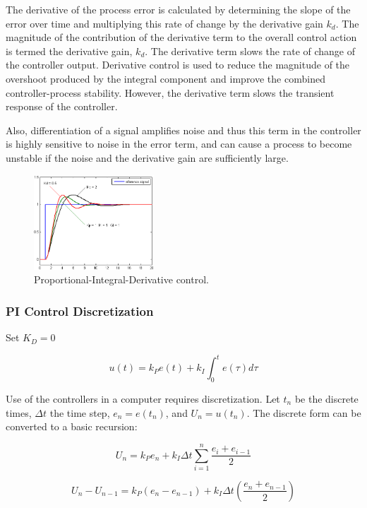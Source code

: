 The derivative of the process error is calculated by determining the
slope of the error over time and multiplying this rate of change by the
derivative gain \(k_d\). The magnitude of the contribution of the
derivative term to the overall control action is termed the derivative
gain, \(k_d\). The derivative term slows the rate of change of the
controller output. Derivative control is used to reduce the magnitude of
the overshoot produced by the integral component and improve the
combined controller-process stability. However, the derivative term
slows the transient response of the controller.

Also, differentiation of a signal amplifies noise and thus this term in
the controller is highly sensitive to noise in the error term, and can
cause a process to become unstable if the noise and the derivative gain
are sufficiently large.

\begin{figure}
\centering
\includegraphics[width=0.4\textwidth,height=\textheight]{ControlFigures/Change_with_Kd.png}
\caption{Proportional-Integral-Derivative control.}
\end{figure}

\hypertarget{pi-control-discretization}{%
\subsubsection{PI Control
Discretization}\label{pi-control-discretization}}

Set \(K_D=0\)

\[u(t) = k_P  e(t) + k_I \int_0^t e(\tau)d\tau\]

Use of the controllers in a computer requires discretization. Let
\(t_n\) be the discrete times, \(\Delta t\) the time step,
\(e_n = e(t_n)\), and \(U_n = u(t_n)\). The discrete form can be
converted to a basic recursion:

\[U_n = k_P e_n + k_I \Delta t \sum_{i=1}^n \frac{e_i + e_{i-1}}{2}\]

\[U_n - U_{n-1} = k_P(e_n - e_{n-1}) + k_I \Delta t \left( \frac{e_n + e_{n-1}}{2}\right)\]

